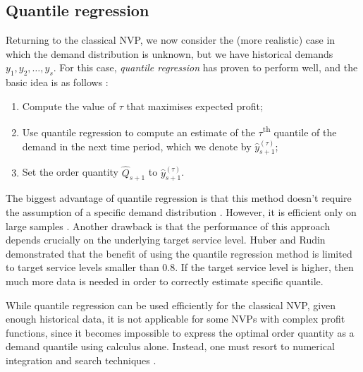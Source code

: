 \documentclass{article}
\begin{document}
\subsection{Quantile regression} \label{sub:lit3}

Returning to the classical NVP, we now consider the (more realistic) case in which the demand distribution is unknown, but we have historical demands $y_1,y_2,\dots,y_s$.
For this case, \emph{quantile regression}
has proven to perform well, and the basic idea is as follows \cite{BT06,Br16,CS19,HNS15,Hu19}:
\begin{enumerate}
\item Compute the value of $\tau$ that maximises expected profit;
\item Use quantile regression to compute an estimate of the $\tau$\textsuperscript{th} quantile of the demand in the next time period, which we denote by $\hat{y}_{s+1}^{(\tau)}$;
\item Set the order quantity $\hat{Q}_{s+1}$ to $\hat{y}_{s+1}^{(\tau)}$.
\end{enumerate}

The biggest advantage of quantile regression is that this method doesn't require the assumption of a specific demand distribution \cite{Hu19}. However, it is efficient only on large samples \cite{Hu19,RV19}. Another drawback is that the performance of this approach depends crucially on the underlying target service level. Huber \cite{Hu19} and Rudin \cite{RV19} demonstrated that the benefit of using the quantile regression method is limited to target service levels smaller than 0.8. If the target service level is higher, then much more data is needed in order to correctly estimate specific quantile.

While quantile regression can be used efficiently for the classical NVP, given enough historical data, it is not applicable for some NVPs with complex profit functions, since it becomes impossible to express the optimal order quantity as a demand quantile using calculus alone. Instead, one must resort to numerical integration and search techniques \cite{SW81}.


\end{document}
